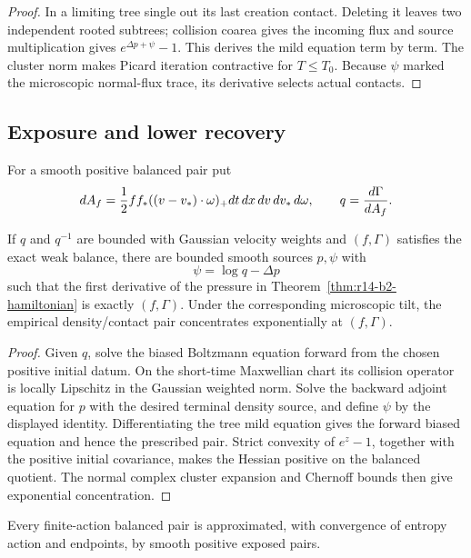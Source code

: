 \begin{proof}
In a limiting tree single out its last creation contact.  Deleting it leaves
two independent rooted subtrees; collision coarea gives the incoming flux
and source multiplication gives
\(e^{\Delta p+\psi}-1\).  This derives the mild equation term by term.
The cluster norm makes Picard iteration contractive for \(T\le T_0\).
Because \(\psi\) marked the microscopic normal-flux trace, its derivative
selects actual contacts.
\end{proof}

\subsection{Exposure and lower recovery}

For a smooth positive balanced pair put
\[
 dA_f={1\over2}ff_*((v-v_*)\cdot\omega)_+
 dt\,dx\,dv\,dv_*\,d\omega,\qquad
 q={d\Gamma\over dA_f}.
\]

\begin{lemma}
\label{lem:r14-b2-expose}
If \(q\) and \(q^{-1}\) are bounded with Gaussian velocity weights and
\((f,\Gamma)\) satisfies the exact weak balance, there are bounded smooth
sources \(p,\psi\) with
\[
 \psi=\log q-\Delta p
\]
such that the first derivative of the pressure in
Theorem~\ref{thm:r14-b2-hamiltonian} is exactly \((f,\Gamma)\).  Under the
corresponding microscopic tilt, the empirical density/contact pair
concentrates exponentially at \((f,\Gamma)\).
\end{lemma}

\begin{proof}
Given \(q\), solve the biased Boltzmann equation forward from the chosen
positive initial datum.  On the short-time Maxwellian chart its collision
operator is locally Lipschitz in the Gaussian weighted norm.  Solve the
backward adjoint equation for \(p\) with the desired terminal density source,
and define \(\psi\) by the displayed identity.  Differentiating the tree mild
equation gives the forward biased equation and hence the prescribed pair.
Strict convexity of \(e^z-1\), together with the positive initial covariance,
makes the Hessian positive on the balanced quotient.  The normal complex
cluster expansion and Chernoff bounds then give exponential concentration.
\end{proof}

\begin{lemma}
\label{lem:r14-b2-repair}
Every finite-action balanced pair is approximated, with convergence of
entropy action and endpoints, by smooth positive exposed pairs.
\end{lemma}

